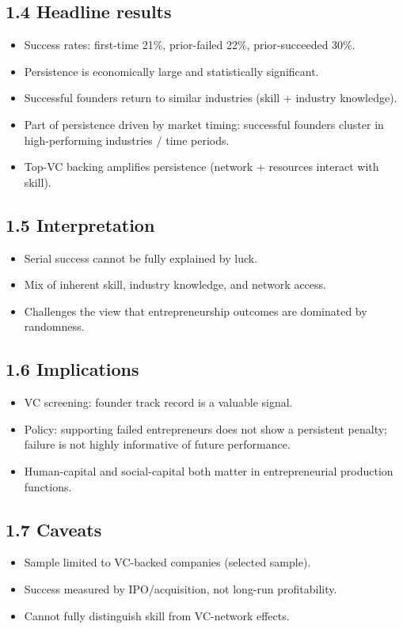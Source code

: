 \documentclass[11pt]{article}
\begin{document}
\subsection*{1.4 Headline results}
\begin{itemize}
\item Success rates: first-time 21\%, prior-failed 22\%, prior-succeeded 30\%.
\item Persistence is economically large and statistically significant.
\item Successful founders return to similar industries (skill + industry knowledge).
\item Part of persistence driven by market timing: successful founders cluster in high-performing industries / time periods.
\item Top-VC backing amplifies persistence (network + resources interact with skill).
\end{itemize}

\subsection*{1.5 Interpretation}
\begin{itemize}
\item Serial success cannot be fully explained by luck.
\item Mix of inherent skill, industry knowledge, and network access.
\item Challenges the view that entrepreneurship outcomes are dominated by randomness.
\end{itemize}

\subsection*{1.6 Implications}
\begin{itemize}
\item VC screening: founder track record is a valuable signal.
\item Policy: supporting failed entrepreneurs does not show a persistent penalty; failure is not highly informative of future performance.
\item Human-capital and social-capital both matter in entrepreneurial production functions.
\end{itemize}

\subsection*{1.7 Caveats}
\begin{alertbox}
\begin{itemize}
\item Sample limited to VC-backed companies (selected sample).
\item Success measured by IPO/acquisition, not long-run profitability.
\item Cannot fully distinguish skill from VC-network effects.
\end{itemize}
\end{alertbox}
\end{document}
